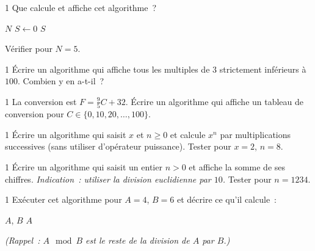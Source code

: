 \begin{exo}{1}
Que calcule et affiche cet algorithme~?

\begin{algorithm}[H]
\Lire $N$\;
$S \leftarrow 0$\;
\Afficher $S$\;
\end{algorithm}

V\'erifier pour $N=5$.
\end{exo}

\begin{exo}{1}
\'Ecrire un algorithme qui affiche tous les multiples de $3$
strictement inf\'erieurs \`a $100$.
Combien y en a-t-il~?
\end{exo}

\begin{exo}{1}
La conversion est $F = \frac{9}{5}C + 32$.
\'Ecrire un algorithme qui affiche un tableau de conversion pour
$C \in \{0, 10, 20, \ldots, 100\}$.
\end{exo}

\begin{exo}{1}
\'Ecrire un algorithme qui saisit $x$ et $n \geq 0$ et calcule $x^n$
par multiplications successives (sans utiliser d'op\'erateur puissance).
Tester pour $x=2$, $n=8$.
\end{exo}

\begin{exo}{1}
\'Ecrire un algorithme qui saisit un entier $n > 0$ et affiche la somme
de ses chiffres.
\emph{Indication~: utiliser la division euclidienne par $10$.}
Tester pour $n = 1234$.
\end{exo}

\begin{exo}{1}
Ex\'ecuter cet algorithme pour $A=4$, $B=6$ et d\'ecrire ce qu'il calcule~:

\begin{algorithm}[H]
\Lire $A$, $B$\;
\Afficher $A$\;
\end{algorithm}

\emph{(Rappel~: $A \mod B$ est le reste de la division de $A$ par $B$.)}
\end{exo}

